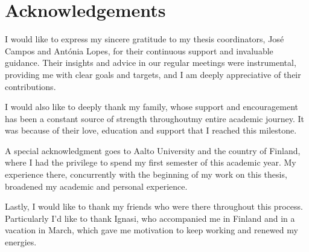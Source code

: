 \chapter*{Acknowledgements}

I would like to express my sincere gratitude to my thesis coordinators, José Campos and Antónia Lopes, for their continuous support and invaluable guidance.
Their insights and advice in our regular meetings were instrumental, providing me with clear goals and targets, and I am deeply appreciative of their contributions.

I would also like to deeply thank my family, whose support and encouragement has been a constant source of strength throughoutmy entire academic journey. 
It was because of their love, education and support that I reached this milestone.

A special acknowledgment goes to Aalto University and the country of Finland, where I had the privilege to spend my first semester of this academic year.
My experience there, concurrently with the beginning of my work on this thesis, broadened my academic and personal experience.

Lastly, I would like to thank my friends who were there throughout this process.
Particularly I'd like to thank Ignasi, who accompanied me in Finland and in a vacation in March,
which gave me motivation to keep working and renewed my energies. 


\vspace{10mm}
